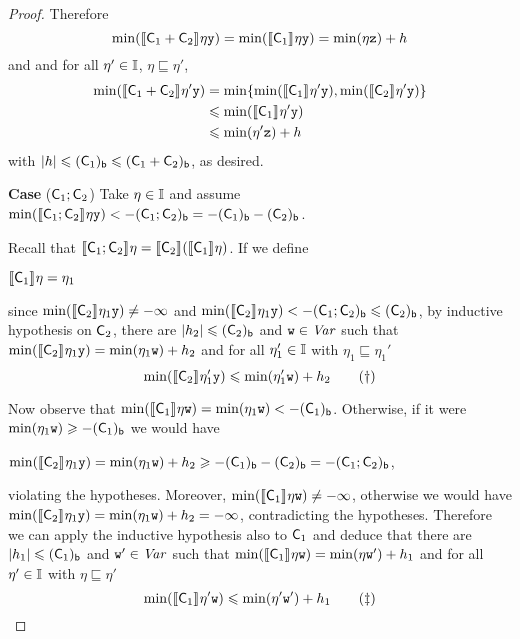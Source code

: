 \begin{proof}
  Therefore 
  \[
  \min(\semi{\com_1 \ndet \com_2}\eta \var[y])
  = \min(\semi{\com_1}\eta \var[y]) = \min(\eta \var[z]) + h
  \]
  and and for
  all \(\eta' \in \inte\), \(\eta \sqsubseteq \eta'\),
  \begin{align*}
    \min(\semi{\com_1 \ndet \com_2}\eta' \var[y])
    &= \min\{ \min(\semi{\com_1}\eta' \var[y]),  \min(\semi{\com_2}\eta' \var[y])\}\\
    & \leq \min(\semi{\com_1}\eta' \var[y])\\
    & \leq \min(\eta' \var[z]) + h
  \end{align*}
  with \(|h| \leq \lbound{\com_1} \leq \lbound{\com_1 \ndet \com_2}\), as desired.

  
  \medskip
  
  \noindent
  \textbf{Case} (\(\com_1 \seq \com_2\))
  Take \(\eta \in \inte\) and assume
  \(\min(\semi{\com_1 \seq \com_2}\eta\var[y]) < -\lbound{\com_1 \seq
    \com_2} = - \lbound{\com_1} - \lbound{\com_2}\).
  
  Recall that
  \(\semi{\com_1 \seq \com_2} \eta = \semi{\com_2}(\semi{\com_1}\eta)\).
  If we define
  \begin{center}
    \(\semi{\com_1} \eta = \eta_1\)
  \end{center}
  since \(\min(\semi{\com_2}\eta_1 \var[y]) \neq -\infty\) and
  \(\min(\semi{\com_2} \eta_1 \var[y]) < -\lbound{\com_1 \seq \com_2}
  \leq \lbound{\com_2}\), by inductive hypothesis on \(\com_2\), there
  are \(|h_2| \leq \lbound{\com_2}\) and \(\var[w] \in \Var\) such that
  \(\min(\semi{\com_2} \eta_1 \var[y]) = \min(\eta_1 \var[w]) + h_2\)
  and for all \(\eta_1' \in \inte\) with
  \(\eta_1 \sqsubseteq \eta_1'\)
  \begin{equation}
    \label{eq:seq2}
    \min(\semi{\com_2} \eta_1' \var[y]) \leq \min(\eta_1' \var[w]) + h_2
    \tag{\dag}
  \end{equation}
  
  Now observe that
  \(\min(\semi{\com_1}\eta \var[w]) = \min(\eta_1 \var[w]) < -
  \lbound{\com_1}\). Otherwise, if it were
  \(\min(\eta_1 \var[w]) \geq -\lbound{\com_1}\) we would have
  \begin{center}
    \(\min(\semi{\com_2}\eta_1 \var[y]) = \min(\eta_1 \var[w]) + h_2 \geq
    - \lbound{\com_1} - \lbound{\com_2} = - \lbound{\com_1 \seq \com_2}\),
  \end{center}
  violating the hypotheses. Moreover,
  \(\min(\semi{\com_1}\eta \var[w]) \neq - \infty\), otherwise we
  would have
  \(\min(\semi{\com_2} \eta_1 \var[y]) = \min(\eta_1 \var[w]) + h_2 =
  - \infty\), contradicting the hypotheses.  Therefore we can apply
  the inductive hypothesis also to \(\com_1\) and deduce that there
  are \(|h_1| \leq \lbound{\com_1}\) and \(\var[w]' \in \Var\) such
  that
  \(\min(\semi{\com_1} \eta \var[w]) = \min(\eta \var[w]') + h_1\) and
  for all \(\eta' \in \inte\) with \(\eta \sqsubseteq \eta'\)
  \begin{equation}
    \label{eq:seq1}
    \min(\semi{\com_1} \eta' \var[w]) \leq \min(\eta' \var[w]') + h_1
    \tag{\ddag}
  \end{equation}


\end{proof}
